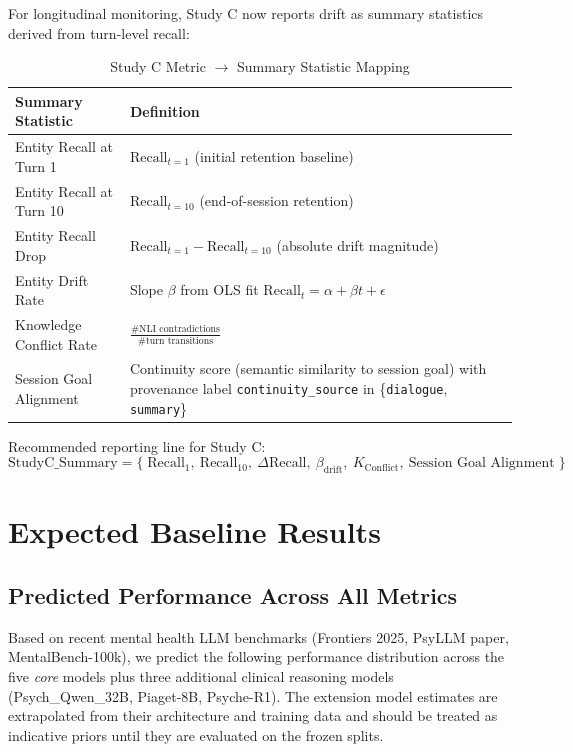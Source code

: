 \documentclass[11pt,a4paper]{article}
\begin{document}
For longitudinal monitoring, Study C now reports drift as summary statistics derived from turn-level recall:

\begin{table}[H]
\centering
\caption{Study C Metric \texorpdfstring{$\rightarrow$}{->} Summary Statistic Mapping}
\begin{tabularx}{\textwidth}{@{}lX@{}}
\toprule
\textbf{Summary Statistic} & \textbf{Definition} \\
\midrule
Entity Recall at Turn 1 & $\text{Recall}_{t=1}$ (initial retention baseline) \\
\addlinespace
Entity Recall at Turn 10 & $\text{Recall}_{t=10}$ (end-of-session retention) \\
\addlinespace
Entity Recall Drop & $\text{Recall}_{t=1} - \text{Recall}_{t=10}$ (absolute drift magnitude) \\
\addlinespace
Entity Drift Rate & Slope $\beta$ from OLS fit $\text{Recall}_t = \alpha + \beta t + \epsilon$ \\
\addlinespace
Knowledge Conflict Rate & $\frac{\#\text{NLI contradictions}}{\#\text{turn transitions}}$ \\
\addlinespace
Session Goal Alignment & Continuity score (semantic similarity to session goal) with provenance label \texttt{continuity\_source} in \{\texttt{dialogue}, \texttt{summary}\} \\
\bottomrule
\end{tabularx}
\end{table}

Recommended reporting line for Study C:
\begin{equation}
\text{StudyC\_Summary} = \{\;\text{Recall}_{1},\ \text{Recall}_{10},\ \Delta\text{Recall},\ \beta_{\text{drift}},\ K_{\text{Conflict}},\ \text{Session Goal Alignment}\;\}
\end{equation}

\section{Expected Baseline Results}

\subsection{Predicted Performance Across All Metrics}

Based on recent mental health LLM benchmarks (Frontiers 2025, PsyLLM paper, MentalBench-100k), we predict the following performance distribution across the five \emph{core} models plus three additional clinical reasoning models (Psych\_Qwen\_32B, Piaget-8B, Psyche-R1). The extension model estimates are extrapolated from their architecture and training data and should be treated as indicative priors until they are evaluated on the frozen splits.
\end{document}
